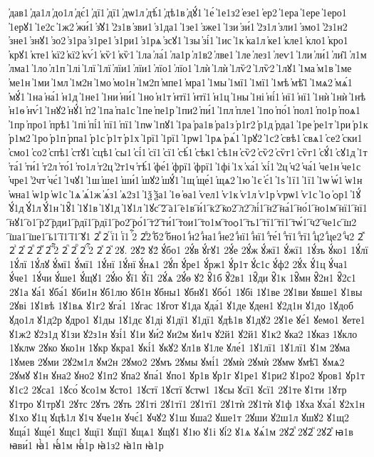 {҆дав1
҆да1л
҆до1л
҆дє́1
҆дї1
҆дї1
҆дѡ1л
҆дѣ́1
҆дѣ1в
҆дꙋ́1
҆1е́
҆1е1з2
҆езе1
҆ер2
҆1ера
҆1ере
҆1еро1
҆1ерꙋ1
҆1е2с
҆1ж2
҆жи́1
҆з̾ꙋ1
҆2з1в
҆зви1
҆з1да1
҆1зе1
҆зже1
҆1зи
҆зи́1
҆2з1л
҆зли1
҆змо1
҆2з1н2
҆зне1
҆знꙋ1
҆зо2
҆з1ра
҆з1ре1
҆з1ри1
҆з1рѧ
҆зсꙋ1
҆1зы
҆зі́1
҆1ис
҆1к
҆ка1л
҆ке1
҆кле1
҆кло1
҆кро1
҆крꙋ1
҆кте1
҆кї2
҆кї2
҆кѵ́1
҆кѷ1
҆кѷ1
҆1ла
҆ла́1
҆ла1р
҆л1в2
҆лве1
҆1ле
҆лез1
҆леѵ1
҆1ли
҆ли́1
҆ли̑1
҆л1м
҆лма1
҆1ло
҆л1п
҆1лі
҆1лї
҆1лї
҆лїи1
҆лїи1
҆лїо1
҆лїо1
҆1лѝ
҆1лѝ
҆1лѷ2
҆1лѷ2
҆1лꙋ1
҆1ма
҆м1в
҆1ме
҆ме1н
҆1ми
҆1мл
҆1м2н
҆1мо
҆мо1н
҆1м2п
҆мпе1
҆мра1
҆1мы
҆1мї1
҆1мї1
҆1мѣ
҆мѣ̑1
҆1мѧ2
҆мѧ́1
҆мꙋ́1
҆1на
҆на́1
҆н1д
҆1не1
҆1ни
҆ни́1
҆1но
҆н1т
҆нтї1
҆нтї1
҆н1ц
҆1ны
҆1ні
҆ні́1
҆нї1
҆нї1
҆1нѝ
҆1нѝ
҆1нѣ
҆н1ѳ
҆нѵ́1
҆1нꙋ2
҆нꙋ́1
҆п2
҆1па
҆па1с
҆1пе
҆пе1р
҆1пи2
҆пи́1
҆1пл
҆пле1
҆1по
҆по́1
҆пол1
҆по1р
҆поѧ1
҆1пр
҆про1
҆прѣ1
҆1пі
҆пі́1
҆пї1
҆пї1
҆1пѡ
҆1пꙋ1
҆1ра
҆ра1в
҆ра1з
҆р1г2
҆р1д
҆рда1
҆1ре
҆ре1т
҆1ри
҆р1к
҆р1м2
҆1ро
҆р1п
҆рпа1
҆р1с
҆р1т
҆р1х
҆1рї1
҆1рї1
҆1рѡ1
҆1рѧ
҆рѧ́1
҆1рꙋ2
҆1с2
҆свѣ1
҆свѧ1
҆се2
҆ски1
҆смо1
҆со2
҆спѣ1
҆стꙋ1
҆сцѣ1
҆сы1
҆сі́1
҆сї1
҆сї1
҆сѣ́1
҆сѣк1
҆сѣ1н
҆сѷ2
҆сѷ2
҆сѷг1
҆сѷг1
҆сꙋ́1
҆сꙋ1д
҆1т
҆та́1
҆ти́1
҆т2л
҆то́1
҆то1л
҆т2ц
҆2т1ч
҆тѣ́1
҆фе́1
҆фрї1
҆фрї1
҆1фі
҆1х
҆ха́1
҆хі́1
҆2ц
҆ч2
҆ча́1
҆че1н
҆че1с
҆чре1
҆2чт
҆чє́1
҆1чꙋ1
҆1ш
҆ше1
҆ши́1
҆шꙋ2
҆шꙋ́1
҆1щ
҆ще́1
҆щѧ2
҆1ю
҆1є
҆є́1
҆1ѕ
҆1ї1
҆1ї1
҆1ѡ
҆ѡ́1
҆ѡ1н
҆ѡна1
҆ѡ1р
҆ѡ1с
҆1ѧ
҆ѧ́1ж
҆ѧ́з1
҆ѧ2з1
҆1ѯ
҆ѯа1
҆1ѳ
҆ѳа1
҆ѵел1
҆ѵ1к
҆ѵ1л
҆ѵ1р
҆ѵрѡ1
҆ѵ1с
҆1ѻ
҆ѻр1
҆1ꙋ́
҆ꙋ́1д
҆ꙋ́1л
҆ꙋ́1н
҆1ꙋ̑1
҆1ꙋ1в
҆1ꙋ1д
҆1ꙋ1л
҆1ꙋс
҇2
҇а1
҇е1в
҇и́1
҇к2
҇ко2
҇л2
҇лі́1
҇н2
҇на́1
҇но́1
҇но1м
҇нї1
҇нї1
҇нꙋ1
҇о1
҇р2
҇рди1
҇рдї1
҇рдї1
҇ро2
҇ро́1
҇т2
҇ти́1
҇тои1
҇то1м
҇тоѻ1
҇ть1
҇тї1
҇тї1
҇тѡ́1
҇ч2
҇че1с
҇ш2
҇ша1
҇ше1
҇ь1
҇ї1
҇ї1
҇ꙋ1
2ⷡ
2ⷢ
ⷢї1
ⷢї1
ⷢ҇2
2ⷣ2
ⷣб2
ⷣбно1
ⷣн2
ⷣна1
ⷣне2
ⷣнї1
ⷣнї1
ⷣте́1
ⷣтї1
ⷣтї1
ⷣц2
ⷣце2
ⷣч2
2ⷤ
2ⷥ
2ⷦ
2ⷧ
2ⷨ
2ⷩ
ⷪ҇2
2ⷫ
2ⷬ
2ⷭ
ⷭ҇2
2ⷯ
2ⷱ
2ꙋ.
2ꙋ2̀
ꙋ2́
ꙋ́бо1
2ꙋ́в
ꙋ́гꙋ1
2ꙋ́е
2ꙋ́ж
ꙋ́жї1
ꙋ́жї1
1ꙋ́зъ
ꙋ́ко1
1ꙋ́лї
1ꙋ́лї
1ꙋ́лꙋ
ꙋ́мї1
ꙋ́мї1
1ꙋ́нї
1ꙋ́нї
ꙋ́нѧ1
2ꙋ́п
ꙋ́ре1
ꙋ́рж1
ꙋ́р1т
ꙋ́с1с
ꙋ́ф2
2ꙋ́х
ꙋ́1ц
ꙋ́ча1
ꙋ́че1
1ꙋ́чи
ꙋ́ше1
ꙋ́щꙋ1
2ꙋ́ю
ꙋ́ї1
ꙋ́ї1
2ꙋ́ѧ
2ꙋ́ѳ
ꙋ2̑
ꙋ̑1б
ꙋ̑2в1
1ꙋ̑ди
ꙋ̑1к
1ꙋ̑мн
ꙋ̑2н1
ꙋ̑2с1
2ꙋ1а
ꙋа́1
ꙋба́1
ꙋби1н
ꙋб1лю
ꙋб1н
ꙋбны1
ꙋбнꙋ1
ꙋбо́1
1ꙋбі
1ꙋ1ве
2ꙋ1ви
ꙋвше1
ꙋ1вы
2ꙋві
1ꙋ1вѣ
1ꙋ1вѧ
ꙋ1г2
ꙋга́1
1ꙋгас
1ꙋгот
ꙋ1да
ꙋда́1
ꙋ1де
ꙋден1
ꙋ2д1н
ꙋ1до
1ꙋдоб
ꙋдо1л
ꙋ1д2р
ꙋдро1
ꙋ1ды
1ꙋ1дє
ꙋ1ді
ꙋ1дї1
ꙋ1дї1
ꙋдѣ1в
ꙋ1дꙋ2
2ꙋ1е
ꙋе́1
ꙋемо1
ꙋете1
ꙋ1ж2
ꙋ2з1д
ꙋ1зи
ꙋ2з1н
ꙋзі́1
ꙋ1и
ꙋи́2
ꙋи2м
ꙋи1ч
ꙋ2й1
ꙋ2й1
ꙋ1к2
ꙋка2
1ꙋказ
1ꙋкло
1ꙋклѡ
2ꙋко
ꙋко1н
1ꙋкр
ꙋкра1
ꙋкі́1
ꙋкꙋ2
ꙋл1в
ꙋ1ле
ꙋле́1
1ꙋ1лї1
1ꙋ1лї1
ꙋ1м
2ꙋма
1ꙋмев
2ꙋми
2ꙋ2м1л
ꙋм2н
2ꙋмо2
2ꙋмъ
2ꙋмы
ꙋмі́1
2ꙋмѝ
2ꙋмѝ
2ꙋмѡ
ꙋмѣ̑1
ꙋмѧ2
2ꙋмꙋ
ꙋ1н
ꙋна2
ꙋно2
ꙋ1п2
ꙋпа2
ꙋпа́1
ꙋпо1
ꙋр1в
ꙋр1г
ꙋ1ре1
ꙋ1ри2
ꙋ1ро2
ꙋров1
ꙋр1т
ꙋ1с2
2ꙋса1
1ꙋсо́
ꙋсо1м
ꙋсто1
1ꙋстї
1ꙋстї
ꙋстѡ1
1ꙋсы
ꙋсї1
ꙋсї1
2ꙋ1те
ꙋ1ти
1ꙋтр
ꙋ1тро
ꙋ1трꙋ1
2ꙋтс
2ꙋтъ
2ꙋть
2ꙋ1ті
2ꙋ1тї1
2ꙋ1тї1
2ꙋ1тѝ
2ꙋ1тѝ
ꙋ1ф
1ꙋха
ꙋха́1
ꙋ2х1н
ꙋ1хо
ꙋ1ц
ꙋцѣ1л
ꙋ1ч
ꙋче1н
ꙋчє́1
ꙋчꙋ2
ꙋ1ш
ꙋша2
ꙋше1т
2ꙋши
ꙋ2ш1л
ꙋшꙋ2
ꙋ1щ2
ꙋща́1
ꙋще́1
ꙋщє1
ꙋщї1
ꙋщї1
ꙋщѧ1
ꙋщꙋ1
ꙋ1ю
ꙋ1і
ꙋі́2
ꙋ1ѧ
ꙋѧ́1м
2ꙋ2ⷧ
2ꙋ2ⷩ
2ꙋ2ⷯ
ꙗ1в
ꙗви́1
ꙗ҆̀1
ꙗ҆́1м
ꙗ҆́1р
ꙗ҆1з2
ꙗ҆1п
ꙗ҆1р
}
